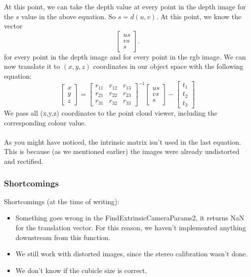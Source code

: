 At this point, we can take the depth value at every point in the depth image for
the $s$ value in the above equation. So $s = d(u,v)$. At this point, we know
the vector $$
\left[ \begin{array}{ccc} 
u s\\
v s\\
s \end{array} \right].
$$ for every point in the depth image and for every point in the rgb image. We 
can now translate it to $(x,y,z)$ coordinates in our object space with the 
following equation:
$$
\left[ \begin{array}{c} 
x\\
y\\
z\end{array} \right] 
=
\left[ \begin{array}{ccc} 
r_{11} & r_{12} & r_{13}\\
r_{21} & r_{22} & r_{23}\\
r_{31} & r_{32} & r_{33}
\end{array} \right]^{-1}
\left[ \begin{array}{c} 
u s\\
v s\\
s \end{array} \right]
-
\left[ \begin{array}{c} 
t_{1}\\
t_{2}\\
t_{3}
\end{array} \right]
$$
We pass all (x,y,z) coordinates to the point cloud viewer, including 
the corresponding colour value. \\
\\
As you might have noticed, the intrinsic matrix isn't used in the last equation.
This is because (as we mentioned earlier) the images were already undistorted
and rectified.

\subsubsection{Shortcomings}

Shortcomings (at the time of writing):

\begin{itemize}

\item Something goes wrong in the FindExtrinsicCameraParams2, it returns NaN for
the translation vector. For this reason, we haven't implemented anything
downstream from this function.

\item We still work with distorted images, since the stereo calibration wasn't
done.

\item We don't know if the cubicle size is correct.

\end{itemize}

